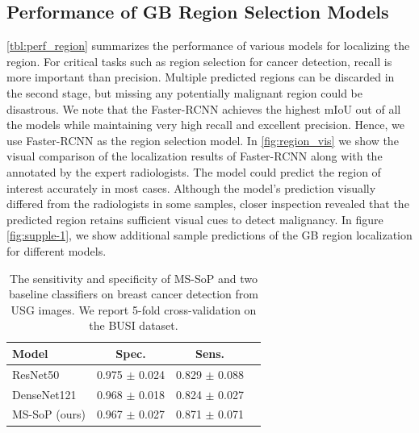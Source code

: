 
%
%
\subsection{Performance of GB Region Selection Models}
%
\cref{tbl:perf_region} summarizes the performance of various models for localizing the \gb region. For critical tasks such as region selection for cancer detection, recall is more important than precision. Multiple predicted regions can be discarded in the second stage, but missing any potentially malignant region could be disastrous. We note that the Faster-RCNN achieves the highest mIoU out of all the models while maintaining very high recall and excellent precision. Hence, we use Faster-RCNN as the region selection model. In \cref{fig:region_vis} we show the visual comparison of the \gb localization results of Faster-RCNN along with the \rois annotated by the expert radiologists. The model could predict the region of interest accurately in most cases. Although the model's prediction visually differed from the radiologists in some samples, closer inspection revealed that the predicted region retains sufficient visual cues to detect malignancy. In figure \ref{fig:supple-1}, we show additional sample predictions of the GB region localization for different models. 

\begin{table}[t]
	\centering
    \footnotesize
    \begin{tabular}{@{}lccc@{}}
    \toprule[1pt]
    \textbf{Model} & \textbf{Spec.} & \textbf{Sens.} \\
    \midrule[0.5pt]
    ResNet50 &  0.975 $\pm$ 0.024 & 0.829 $\pm$ 0.088\\
    DenseNet121  & 0.968 $\pm$ 0.018 & 0.824 $\pm$ 0.027 \\
    \midrule[0.5pt]
    MS-SoP (ours) & 0.967 $\pm$ 0.027 & 0.871 $\pm$ 0.071 \\
    \bottomrule[1pt]
    \end{tabular}
	\caption[Breast cancer detection results]{The sensitivity and specificity of MS-SoP and two baseline classifiers on breast cancer detection from USG images. We report 5-fold cross-validation on the BUSI dataset.}
\label{tbl:busi}
\end{table}

